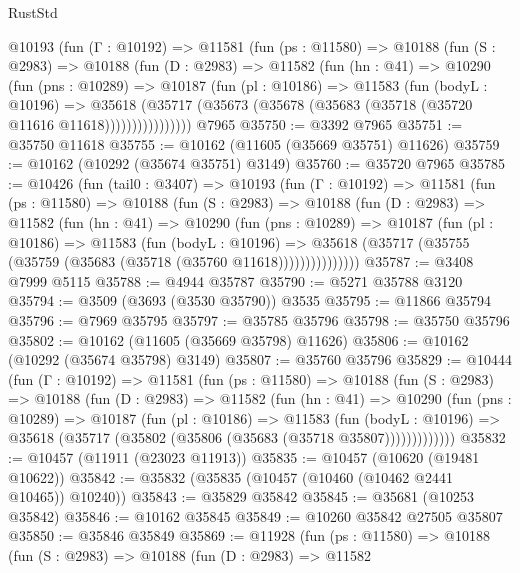 \begin{lexlean}{RustStd}
\begin{coremodule}
      @10193
        (fun (Γ : @10192) =>
        @11581
          (fun (ps : @11580) =>
          @10188
            (fun (S : @2983) =>
            @10188
              (fun (D : @2983) =>
              @11582
                (fun (hn : @41) =>
                @10290
                  (fun (pns : @10289) =>
                  @10187
                    (fun (pl : @10186) =>
                    @11583
                      (fun (bodyL : @10196) =>
                      @35618
                        (@35717
                          (@35673 (@35678 (@35683 (@35718 (@35720 @11616 @11618))))))))))))))))
    @7965
@35750 := @3392 @7965
@35751 := @35750 @11618
@35755 := @10162 (@11605 (@35669 @35751) @11626)
@35759 := @10162 (@10292 (@35674 @35751) @3149)
@35760 := @35720 @7965
@35785 := @10426
    (fun (tail0 : @3407) =>
    @10193
      (fun (Γ : @10192) =>
      @11581
        (fun (ps : @11580) =>
        @10188
          (fun (S : @2983) =>
          @10188
            (fun (D : @2983) =>
            @11582
              (fun (hn : @41) =>
              @10290
                (fun (pns : @10289) =>
                @10187
                  (fun (pl : @10186) =>
                  @11583
                    (fun (bodyL : @10196) =>
                    @35618 (@35717 (@35755 (@35759 (@35683 (@35718 (@35760 @11618)))))))))))))))
@35787 := @3408 @7999 @5115
@35788 := @4944 @35787
@35790 := @5271 @35788 @3120
@35794 := @3509 (@3693 (@3530 @35790)) @3535
@35795 := @11866 @35794
@35796 := @7969 @35795
@35797 := @35785 @35796
@35798 := @35750 @35796
@35802 := @10162 (@11605 (@35669 @35798) @11626)
@35806 := @10162 (@10292 (@35674 @35798) @3149)
@35807 := @35760 @35796
@35829 := @10444
    (fun (Γ : @10192) =>
    @11581
      (fun (ps : @11580) =>
      @10188
        (fun (S : @2983) =>
        @10188
          (fun (D : @2983) =>
          @11582
            (fun (hn : @41) =>
            @10290
              (fun (pns : @10289) =>
              @10187
                (fun (pl : @10186) =>
                @11583
                  (fun (bodyL : @10196) =>
                  @35618 (@35717 (@35802 (@35806 (@35683 (@35718 @35807)))))))))))))
@35832 := @10457 (@11911 (@23023 @11913))
@35835 := @10457 (@10620 (@19481 @10622))
@35842 := @35832 (@35835 (@10457 (@10460 (@10462 @2441 @10465)) @10240))
@35843 := @35829 @35842
@35845 := @35681 (@10253 @35842)
@35846 := @10162 @35845
@35849 := @10260 @35842 @27505 @35807
@35850 := @35846 @35849
@35869 := @11928
    (fun (ps : @11580) =>
    @10188
      (fun (S : @2983) =>
      @10188
        (fun (D : @2983) =>
        @11582

\end{coremodule}
\end{lexlean}
